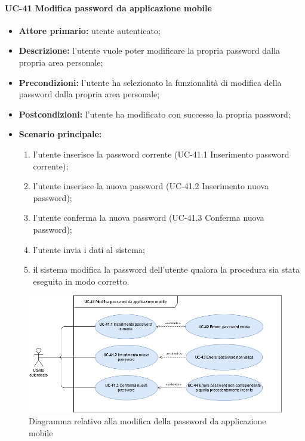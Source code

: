 \paragraph{UC-41 Modifica password da applicazione mobile}

	\begin{itemize}
		\item \textbf{Attore primario:} utente autenticato;

		\item \textbf{Descrizione:}  l'utente vuole poter modificare la propria password dalla propria area personale;

		\item \textbf{Precondizioni:} l'utente ha selezionato la funzionalità di modifica della password dalla propria area personale;

		\item \textbf{Postcondizioni:} l'utente ha modificato con successo la propria password;

		\item \textbf{Scenario principale:}
	  		\begin{enumerate}
		  		\item l'utente inserisce la password corrente (UC-41.1 Inserimento password corrente);
		  		\item l'utente inserisce la nuova password (UC-41.2 Inserimento nuova password);
		  		\item l'utente conferma la nuova password (UC-41.3 Conferma nuova password);
		  		\item l'utente invia i dati al sistema;
		  		\item il sistema modifica la password dell'utente qualora la procedura sia stata eseguita in modo corretto.
	  		\end{enumerate}
	\end{itemize}

	\begin{figure}[H]
		\centering
		  \includegraphics[scale=0.50]{src/CasiDUso/immagini/ModificaPasswordMobile.png}
		\caption{Diagramma relativo alla modifica della password da applicazione mobile}
	\end{figure}

